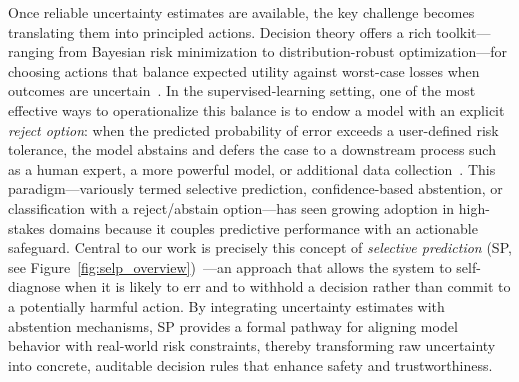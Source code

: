 Once reliable uncertainty estimates are available, the key challenge becomes translating them into principled actions. Decision theory offers a rich toolkit—ranging from Bayesian risk minimization to distribution-robust optimization—for choosing actions that balance expected utility against worst-case losses when outcomes are uncertain~\citep{berger2013statistical,rahimian2022frameworks}. In the supervised-learning setting, one of the most effective ways to operationalize this balance is to endow a model with an explicit \emph{reject option}: when the predicted probability of error exceeds a user-defined risk tolerance, the model abstains and defers the case to a downstream process such as a human expert, a more powerful model, or additional data collection~\citep{bartlett2008classification,geifman2017selective}. This paradigm—variously termed selective prediction, confidence-based abstention, or classification with a reject/abstain option—has seen growing adoption in high-stakes domains because it couples predictive performance with an actionable safeguard. Central to our work is precisely this concept of \textit{selective prediction} (SP, see Figure~\ref{fig:selp_overview})~\citep{chow1957optimum,el2010foundations}—an approach that allows the system to self-diagnose when it is likely to err and to withhold a decision rather than commit to a potentially harmful action. By integrating uncertainty estimates with abstention mechanisms, SP provides a formal pathway for aligning model behavior with real-world risk constraints, thereby transforming raw uncertainty into concrete, auditable decision rules that enhance safety and trustworthiness.



